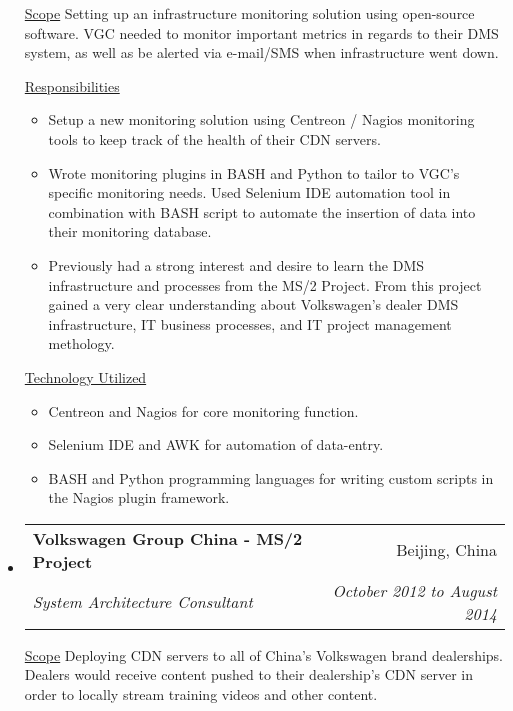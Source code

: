 \documentclass[a4paper,11pt]{article}
\makeatletter
\newcommand{\resitem}[1]{\item #1 \vspace{-2pt}}
\newcommand{\ressubheading}[4]{
\begin{tabular*}{6.5in}{l@{\cftdotfill{\cftsecdotsep}\extracolsep{\fill}}r}
        \textbf{#1} & #2 \\
        \textit{#3} & \textit{#4} \\
\end{tabular*}\vspace{-6pt}}
\makeatother
\begin{document}
\begin{itemize}
        \underline{Scope}
        \linebreak
        \linebreak
        Setting up an infrastructure monitoring solution using open-source software. VGC needed to monitor important metrics in regards to their DMS system, as well as be alerted via e-mail/SMS when infrastructure went down.

        \underline{Responsibilities}
        \begin{itemize}
            \resitem{Setup a new monitoring solution using Centreon / Nagios monitoring tools to keep track of the health of their CDN servers.}
            \resitem{Wrote monitoring plugins in BASH and Python to tailor to VGC's specific monitoring needs. Used Selenium IDE automation tool in combination with BASH script to automate the insertion of data into their monitoring database.}
            \resitem{Previously had a strong interest and desire to learn the DMS infrastructure and processes from the MS/2 Project. From this project gained a very clear understanding about Volkswagen's dealer DMS infrastructure, IT business processes, and IT project management methology.}
        \end{itemize}

        \underline{Technology Utilized}
        \begin{itemize}
            \resitem{Centreon and Nagios for core monitoring function.}
            \resitem{Selenium IDE and AWK for automation of data-entry.}
            \resitem{BASH and Python programming languages for writing custom scripts in the Nagios plugin framework.}
        \end{itemize}

    \item
        \ressubheading{Volkswagen Group China - MS/2 Project}{Beijing, China}{System Architecture Consultant}{October 2012 to August 2014}
        \linebreak
        \linebreak
        
        \underline{Scope}
        \linebreak
        \linebreak
        Deploying CDN servers to all of China's Volkswagen brand dealerships. Dealers would receive content pushed to their dealership's CDN server in order to locally stream training videos and other content.
        

\end{itemize}
\end{document}
